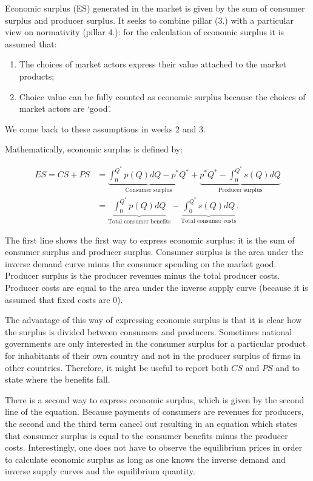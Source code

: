 \documentclass[
]{book}
\providecommand{\tightlist}{%
  \setlength{\itemsep}{0pt}\setlength{\parskip}{0pt}}
\begin{document}
Economic surplus (ES) generated in the market is given by the sum of consumer surplus and producer surplus. It seeks to combine pillar (3.) with a particular view on normativity (pillar 4.): for the calculation of economic surplus it is assumed that:

\begin{enumerate}
\def\labelenumi{\arabic{enumi}.}
\tightlist
\item
  The choices of market actors express their value attached to the market products;
\item
  Choice value can be fully counted as economic surplus because the choices of market actors are `good'.
\end{enumerate}

We come back to these assumptions in weeks 2 and 3.

Mathematically, economic surplus is defined by:

\begin{align}
ES = CS + PS &= \underbrace{\int_0^{Q^\ast} p(Q)dQ - p^\ast Q^\ast}_\text{Consumer surplus} + \underbrace{p^\ast Q^\ast - \int^{Q^\ast}_0 s(Q)dQ}_\text{Producer surplus}\\
&= \underbrace{\int_0^{Q^\ast} p(Q)dQ}_\text{Total consumer benefits} - \underbrace{\int^{Q^\ast}_0 s(Q)dQ}_\text{Total consumer costs}.
\end{align}

The first line shows the first way to express economic surplus: it is the sum of consumer surplus and producer surplus. Consumer surplus is the area under the inverse demand curve minus the consumer spending on the market good. Producer surplus is the producer revenues minus the total producer costs. Producer costs are equal to the area under the inverse supply curve (because it is assumed that fixed costs are 0).

The advantage of this way of expressing economic surplus is that it is clear how the surplus is divided between consumers and producers. Sometimes national governments are only interested in the consumer surplus for a particular product for inhabitants of their own country and not in the producer surplus of firms in other countries. Therefore, it might be useful to report both \(CS\) and \(PS\) and to state where the benefits fall.

There is a second way to express economic surplus, which is given by the second line of the equation. Because payments of consumers are revenues for producers, the second and the third term cancel out resulting in an equation which states that consumer surplus is equal to the consumer benefits minus the producer costs. Interestingly, one does not have to observe the equilibrium prices in order to calculate economic surplus as long as one knows the inverse demand and inverse supply curves and the equilibrium quantity.
\end{document}

